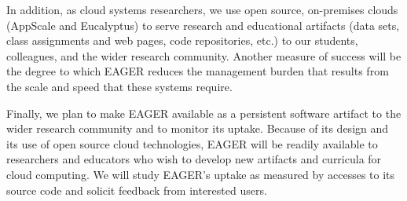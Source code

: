 \documentclass[10pt]{article}
\begin{document}
In addition,
as cloud systems researchers, we use open source, on-premises clouds (AppScale
and Eucalyptus) to serve research and educational artifacts (data sets, class
assignments and web pages, code repositories, etc.) to our students,
colleagues, and the wider research community.  Another measure of success will
be the degree to which EAGER reduces the management burden that results from
the scale and speed that these systems require.

Finally, we plan to make EAGER available as a persistent software artifact to
the wider research community and to monitor its uptake.  Because of its design
and its use of open source cloud technologies, EAGER will be readily available
to researchers and educators who wish to develop new artifacts and curricula
for cloud computing.  We will study EAGER's uptake as measured by accesses to
its source code and solicit feedback from interested users.
\end{document}
